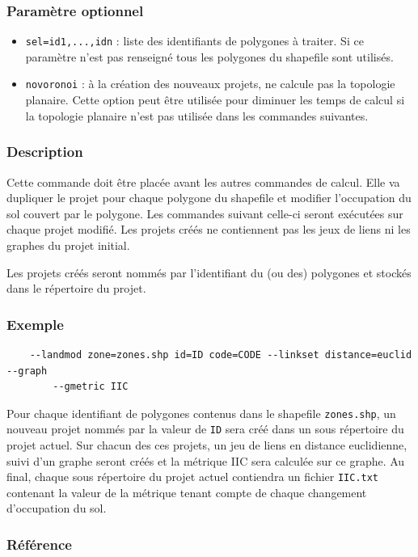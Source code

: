 \documentclass[a4paper,10pt]{report}
\begin{document}
\subsubsection{Paramètre optionnel}
\begin{itemize}
	\item \verb|sel=id1,...,idn| : liste des identifiants de polygones à traiter. Si ce paramètre n'est pas renseigné tous les polygones du shapefile sont utilisés.
	\item \verb|novoronoi| : à la création des nouveaux projets, ne calcule pas la topologie planaire. Cette option peut être utilisée pour diminuer les temps de calcul si la topologie planaire n'est pas utilisée dans les commandes suivantes.
\end{itemize}

\subsubsection{Description}
Cette commande doit être placée avant les autres commandes de calcul. Elle va dupliquer le projet pour chaque polygone du shapefile et modifier l'occupation du sol couvert par le polygone. Les commandes suivant celle-ci seront exécutées sur chaque projet modifié. Les projets créés ne contiennent pas les jeux de liens ni les graphes du projet initial.

Les projets créés seront nommés par l'identifiant du (ou des) polygones et stockés dans le répertoire du projet.

\subsubsection{Exemple}
\begin{Verbatim}
	--landmod zone=zones.shp id=ID code=CODE --linkset distance=euclid --graph 
		--gmetric IIC
\end{Verbatim}
Pour chaque identifiant de polygones contenus dans le shapefile \verb|zones.shp|, un nouveau projet nommés par la valeur de \verb|ID| sera créé dans un sous répertoire du projet actuel. Sur chacun des ces projets, un jeu de liens en distance euclidienne, suivi d'un graphe seront créés et la métrique IIC sera calculée sur ce graphe.
Au final, chaque sous répertoire du projet actuel contiendra un fichier \verb|IIC.txt| contenant la valeur de la métrique tenant compte de chaque changement d'occupation du sol.

\subsubsection{Référence}
\cite{2017_landmod}
\end{document}
